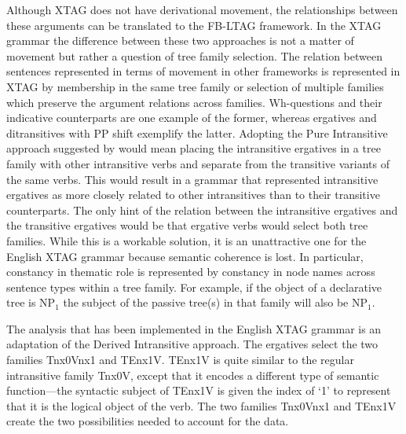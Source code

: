 Although XTAG does not have derivational movement, the relationships between
these arguments can be translated to the FB-LTAG framework.  In the XTAG
grammar the difference between these two approaches is not a matter of movement
but rather a question of tree family selection.  The relation between sentences
represented in terms of movement in other frameworks is represented in XTAG by
membership in the same tree family or selection of multiple families which
preserve the argument relations across families. Wh-questions and their
indicative counterparts are one example of the former, whereas ergatives and
ditransitives with PP shift exemplify the latter.  Adopting the Pure
Intransitive approach suggested by
\cite{Napoli88} would mean placing the intransitive ergatives in a
tree family with other intransitive verbs and separate from the
transitive variants of the same verbs.  This would result in a grammar
that represented intransitive ergatives as more closely related to
other intransitives than to their transitive counterparts.  The only
hint of the relation between the intransitive ergatives and the
transitive ergatives would be that ergative verbs would select both
tree families. While this is a workable solution, it is an
unattractive one for the English XTAG grammar because semantic
coherence is lost.  In particular, constancy in thematic role is
represented by constancy in node names across sentence types within a
tree family. For example, if the object of a declarative tree is
NP$_{1}$ the subject of the passive tree(s) in that family will also
be NP$_{1}$.  

The analysis that has been implemented in the English XTAG grammar is
an adaptation of the Derived Intransitive approach.  The ergatives
select the two families Tnx0Vnx1 and TEnx1V.  TEnx1V is quite similar
to the regular intransitive family Tnx0V, except that it encodes a
different type of semantic function---the syntactic subject of TEnx1V
is given the index of `1' to represent that it is the logical object
of the verb.  The two families Tnx0Vnx1 and TEnx1V create the two
possibilities needed to account for the data.

